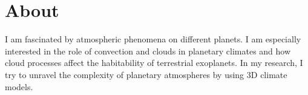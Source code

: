 \documentclass[a4paper, 11pt]{article}
\begin{document}
\thispagestyle{empty}

\keepXColumns



\section{About}
I am fascinated by atmospheric phenomena on different planets.
I am especially interested in the role of convection and clouds in planetary climates and how cloud processes affect the habitability of terrestrial exoplanets.
In my research, I try to unravel the complexity of planetary atmospheres by using 3D climate models.

\end{document}
